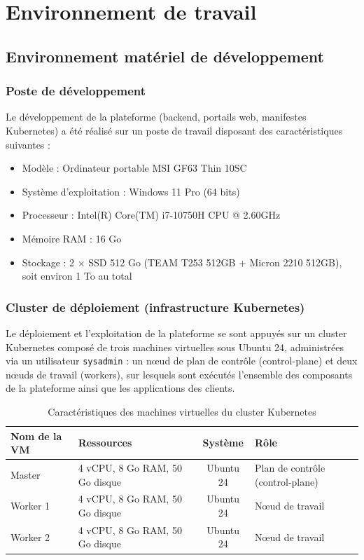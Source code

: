 \section{Environnement de travail}

\subsection{Environnement matériel de développement}
\label{sec:env-materiel}

\subsubsection{Poste de développement}

Le développement de la plateforme (backend, portails web, manifestes Kubernetes) a été réalisé sur un poste de travail disposant des caractéristiques suivantes :

\begin{itemize}
    \item Modèle : Ordinateur portable MSI GF63 Thin 10SC
    \item Système d'exploitation : Windows 11 Pro (64 bits)
    \item Processeur : Intel(R) Core(TM) i7-10750H CPU @ 2.60GHz
    \item Mémoire RAM : 16 Go
    \item Stockage : 2 $\times$ SSD 512 Go (TEAM T253 512GB + Micron 2210 512GB), soit environ 1 To au total
\end{itemize}

\subsubsection{Cluster de déploiement (infrastructure Kubernetes)}

Le déploiement et l'exploitation de la plateforme se sont appuyés sur un cluster Kubernetes composé de trois machines virtuelles sous Ubuntu 24, administrées via un utilisateur \texttt{sysadmin} : un nœud de plan de contrôle (control-plane) et deux nœuds de travail (workers), sur lesquels sont exécutés l'ensemble des composants de la plateforme ainsi que les applications des clients.

\begin{table}[H]
\centering
\renewcommand{\arraystretch}{1.3}
\begin{tabular}{|l|p{4cm}|c|p{5cm}|}
\hline
\textbf{Nom de la VM} & \textbf{Ressources} & \textbf{Système} & \textbf{Rôle} \\
\hline
Master   & 4 vCPU, 8 Go RAM, 50 Go disque & Ubuntu 24 & Plan de contrôle (control-plane) \\
\hline
Worker 1 & 4 vCPU, 8 Go RAM, 50 Go disque & Ubuntu 24 & Nœud de travail \\
\hline
Worker 2 & 4 vCPU, 8 Go RAM, 50 Go disque & Ubuntu 24 & Nœud de travail \\
\hline
\end{tabular}
\caption{Caractéristiques des machines virtuelles du cluster Kubernetes}
\label{tab:vms-cluster}
\end{table}

